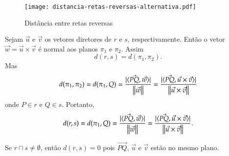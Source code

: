 \begin{figure}[!h]
    \centering
    \caption{Dist\^ancia entre retas reversas}
    \texttt{[image: distancia-retas-reversas-alternativa.pdf]}
\end{figure}

Sejam $\vec{u}$ e $\vec{v}$ os vetores diretores de $r$ e $s$, respectivamente. Ent\~ao o vetor $\vec{w} = \vec{u}\times\vec{v}$ \'e normal aos planos $\pi_1$ e $\pi_2$. Assim
\[
    d(r,s) = d(\pi_1,\pi_2).
\]
Mas
\[
    d(\pi_1,\pi_2) = d(\pi_1, Q) = \dfrac{|\langle\vec{PQ},\vec{w}\rangle|}{\left\Vert{\vec{w}}\right\Vert} = \dfrac{|\langle\vec{PQ},\vec{u}\times\vec{v}\rangle|}{\left\Vert{\vec{u}\times\vec{v}}\right\Vert}
\]
onde $P \in r$ e $Q \in s$. Portanto,
\[
    d(r,s) = d(\pi_1, Q) = \dfrac{|\langle\vec{PQ},\vec{w}\rangle|}{\left\Vert{\vec{w}}\right\Vert} = \dfrac{|\langle\vec{PQ},\vec{u}\times\vec{v}\rangle|}{\left\Vert{\vec{u}\times\vec{v}}\right\Vert}.
\]

Se $r \cap s \ne \emptyset$, ent\~ao $d(r,s) = 0$ pois $\vec{PQ}$, $\vec{u}$ e $\vec{v}$ est\~ao no mesmo plano.


